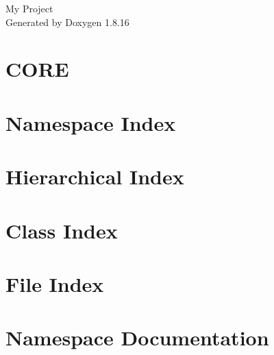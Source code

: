 \let\mypdfximage\pdfximage\def\pdfximage{\immediate\mypdfximage}\documentclass[twoside]{book}
\newcommand{\+}{\discretionary{\mbox{\scriptsize$\hookleftarrow$}}{}{}}
\newcommand{\clearemptydoublepage}{%
  \newpage{\pagestyle{empty}\cleardoublepage}%
}
\begin{document}
\hypersetup{pageanchor=false,
             bookmarksnumbered=true,
             pdfencoding=unicode
            }
\begin{titlepage}
\vspace*{7cm}
\begin{center}%
{\Large My Project }\\
\vspace*{1cm}
{\large Generated by Doxygen 1.8.16}\\
\end{center}
\end{titlepage}
\clearemptydoublepage
{}
\tableofcontents
\clearemptydoublepage
{}
\hypersetup{pageanchor=true}

\chapter{C\+O\+RE}
\label{md__assets__scripts__r_e_a_d_m_e}

\chapter{Namespace Index}

\chapter{Hierarchical Index}

\chapter{Class Index}

\chapter{File Index}

\chapter{Namespace Documentation}

\end{document}

